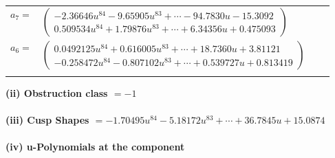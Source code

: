 \documentclass[1p]{elsarticle_modified}
\theoremstyle{definition}
\begin{document}
\begin{tabular}{m{7pt} m{180pt} m{7pt} m{180pt} }
\flushright $a_{7}=$&$\begin{pmatrix}-2.36646 u^{84}-9.65905 u^{83}+\cdots-94.7830 u-15.3092\\0.509534 u^{84}+1.79876 u^{83}+\cdots+6.34356 u+0.475093\end{pmatrix}$ \\
\flushright $a_{6}=$&$\begin{pmatrix}0.0492125 u^{84}+0.616005 u^{83}+\cdots+18.7360 u+3.81121\\-0.258472 u^{84}-0.807102 u^{83}+\cdots+0.539727 u+0.813419\end{pmatrix}$\\&\end{tabular}
\flushleft \textbf{(ii) Obstruction class $= -1$}\\~\\
\flushleft \textbf{(iii) Cusp Shapes $= -1.70495 u^{84}-5.18172 u^{83}+\cdots+36.7845 u+15.0874$}\\~\\
\newpage\renewcommand{\arraystretch}{1}
\flushleft \textbf{(iv) u-Polynomials at the component}\newline \\
\end{document}
